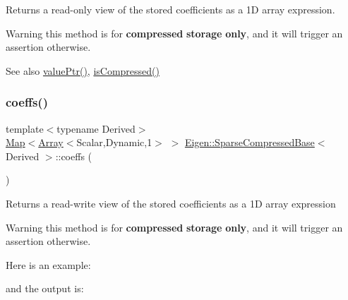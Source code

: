 \begin{DoxyReturn}{Returns}
a read-\/only view of the stored coefficients as a 1D array expression.
\end{DoxyReturn}
\begin{DoxyWarning}{Warning}
this method is for {\bfseries{compressed}} {\bfseries{storage}} {\bfseries{only}}, and it will trigger an assertion otherwise.
\end{DoxyWarning}
\begin{DoxySeeAlso}{See also}
\mbox{\hyperlink{class_eigen_1_1_sparse_compressed_base_a0f12f72d14b6c277d09be9f5ce2eab95}{value\+Ptr()}}, \mbox{\hyperlink{class_eigen_1_1_sparse_compressed_base_a837934b33a80fe996ff20500373d3a61}{is\+Compressed()}} 
\end{DoxySeeAlso}
\mbox{\label{class_eigen_1_1_sparse_compressed_base_a7cf299e08d2a4f6d6869e631e51b12fe}} 
\subsubsection{\texorpdfstring{coeffs()}{coeffs()}\hspace{0.1cm}{\footnotesize\ttfamily [2/2]}}
{\footnotesize\ttfamily template$<$typename Derived$>$ \\
\mbox{\hyperlink{class_eigen_1_1_map}{Map}}$<$\mbox{\hyperlink{class_eigen_1_1_array}{Array}}$<$Scalar,Dynamic,1$>$ $>$ \mbox{\hyperlink{class_eigen_1_1_sparse_compressed_base}{Eigen\+::\+Sparse\+Compressed\+Base}}$<$ Derived $>$\+::coeffs (\begin{DoxyParamCaption}{ }\end{DoxyParamCaption})\hspace{0.3cm}{\ttfamily [inline]}}

\begin{DoxyReturn}{Returns}
a read-\/write view of the stored coefficients as a 1D array expression
\end{DoxyReturn}
\begin{DoxyWarning}{Warning}
this method is for {\bfseries{compressed}} {\bfseries{storage}} {\bfseries{only}}, and it will trigger an assertion otherwise.
\end{DoxyWarning}
Here is an example\+: 
\begin{DoxyCodeInclude}{0}
\end{DoxyCodeInclude}
 and the output is\+: 
\begin{DoxyCodeInclude}{0}
\end{DoxyCodeInclude}


